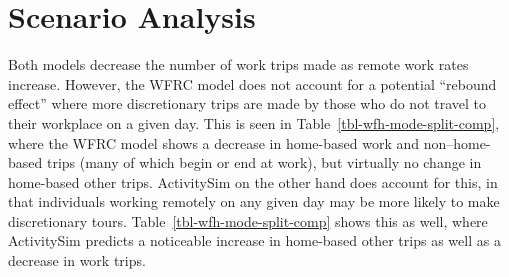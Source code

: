 \documentclass[fancy, twoside, mastersfancy, ms]{byuthesis}
\begin{document}
\begin{table}

\caption{\label{tbl-wfh-telecommute}Telecommute Rates and Coefficients
by Job Industry}


\end{table}%

\section{Scenario Analysis}\label{scenario-analysis-2}

Both models decrease the number of work trips made as remote work rates
increase. However, the WFRC model does not account for a potential
``rebound effect'' where more discretionary trips are made by those who
do not travel to their workplace on a given day. This is seen in
Table~\ref{tbl-wfh-mode-split-comp}, where the WFRC model shows a
decrease in home-based work and non--home-based trips (many of which
begin or end at work), but virtually no change in home-based other
trips. ActivitySim on the other hand does account for this, in that
individuals working remotely on any given day may be more likely to make
discretionary tours. Table~\ref{tbl-wfh-mode-split-comp} shows this as
well, where ActivitySim predicts a noticeable increase in home-based
other trips as well as a decrease in work trips.
\end{document}
